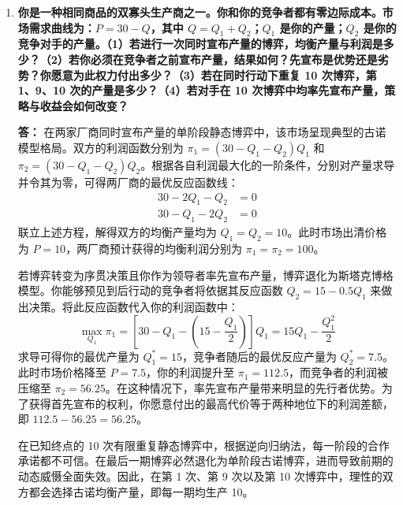 \begin{enumerate}[label=\textbf{\arabic*.}, leftmargin=*]
		当引入信息不完全与非理性行为预期时，即使日本担忧美国政治家可能会放弃最大化本国福利而执意采取封闭政策来惩罚日本，这种心理预期依然不会动摇日本的策略选择。由支付矩阵可知，当美国选择非理性的封闭策略时，日本选择开放可获得福利 5，而选择封闭仅能获得福利 1。由于 5 严格大于 1，开放作为日本严格占优策略的性质在面对非理性外部冲击时展现出极强的稳健性。因此，日本的策略选择不会发生改变，依然会保持开放。此时，博弈的均衡政策将由原先的 (开放, 开放) 实际偏离转变为 (封闭, 开放)，即美国蒙受重大政治惩罚成本，而日本在单边开放下仍能获得次优的社会福利。
		\newpage
		
		\item \textbf{你是一种相同商品的双寡头生产商之一。你和你的竞争者都有零边际成本。市场需求曲线为：$P = 30 - Q$，其中 $Q = Q_1 + Q_2$；$Q_1$ 是你的产量；$Q_2$ 是你的竞争对手的产量。（1）若进行一次同时宣布产量的博弈，均衡产量与利润是多少？（2）若你必须在竞争者之前宣布产量，结果如何？先宣布是优势还是劣势？你愿意为此权力付出多少？（3）若在同时行动下重复 10 次博弈，第 1、9、10 次的产量是多少？（4）若对手在 10 次博弈中均率先宣布产量，策略与收益会如何改变？}
		
		\textbf{答：}
		在两家厂商同时宣布产量的单阶段静态博弈中，该市场呈现典型的古诺模型格局。双方的利润函数分别为 $\pi_1 = (30 - Q_1 - Q_2)Q_1$ 和 $\pi_2 = (30 - Q_1 - Q_2)Q_2$。根据各自利润最大化的一阶条件，分别对产量求导并令其为零，可得两厂商的最优反应函数线：
		\[
		\begin{aligned}
			30 - 2Q_1 - Q_2 &= 0 \\
			30 - Q_1 - 2Q_2 &= 0
		\end{aligned}
		\]
		联立上述方程，解得双方的均衡产量均为 $Q_1 = Q_2 = 10$。此时市场出清价格为 $P = 10$，两厂商预计获得的均衡利润分别为 $\pi_1 = \pi_2 = 100$。
		
		若博弈转变为序贯决策且你作为领导者率先宣布产量，博弈退化为斯塔克博格模型。你能够预见到后行动的竞争者将依据其反应函数 $Q_2 = 15 - 0.5Q_1$ 来做出决策。将此反应函数代入你的利润函数中：
		\[
		\max_{Q_1} \pi_1 = \left[30 - Q_1 - \left(15 - \frac{Q_1}{2}\right)\right]Q_1 = 15Q_1 - \frac{Q_1^2}{2}
		\]
		求导可得你的最优产量为 $Q_1^* = 15$，竞争者随后的最优反应产量为 $Q_2^* = 7.5$。此时市场价格降至 $P = 7.5$，你的利润提升至 $\pi_1 = 112.5$，而竞争者的利润被压缩至 $\pi_2 = 56.25$。在这种情况下，率先宣布产量带来明显的先行者优势。为了获得首先宣布的权利，你愿意付出的最高代价等于两种地位下的利润差额，即 $112.5 - 56.25 = 56.25$。
		
		在已知终点的 10 次有限重复静态博弈中，根据逆向归纳法，每一阶段的合作承诺都不可信。在最后一期博弈必然退化为单阶段古诺博弈，进而导致前期的动态威慑全面失效。因此，在第 1 次、第 9 次以及第 10 次博弈中，理性的双方都会选择古诺均衡产量，即每一期均生产 10。
		

\end{enumerate}
